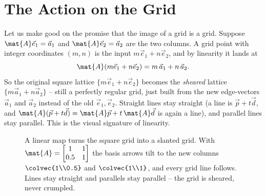 \section{The Action on the Grid}
\label{ch05:grid}

Let us make good on the promise that the image of a grid is a grid. Suppose
$\mat{A}\vec{e}_1 = \vec{a}_1$ and $\mat{A}\vec{e}_2 = \vec{a}_2$ are the two
columns. A grid point with integer coordinates $(m,n)$ is the input
$m\vec{e}_1 + n\vec{e}_2$, and by linearity it lands at
\[
  \mat{A}(m\vec{e}_1 + n\vec{e}_2) = m\,\vec{a}_1 + n\,\vec{a}_2.
\]
So the original square lattice $\{m\vec{e}_1 + n\vec{e}_2\}$ becomes the
\emph{sheared} lattice $\{m\vec{a}_1 + n\vec{a}_2\}$ -- still a perfectly regular
grid, just built from the new edge-vectors $\vec{a}_1$ and $\vec{a}_2$ instead of
the old $\vec{e}_1, \vec{e}_2$. Straight lines stay straight (a line is
$\vec{p} + t\vec{d}$, and $\mat{A}(\vec{p}+t\vec{d}) = \mat{A}\vec{p} +
t\,\mat{A}\vec{d}$ is again a line), and parallel lines stay parallel. This is
the visual signature of linearity.

\begin{figure}[H]
\centering
{}
\caption{A linear map turns the square grid into a slanted grid. With
$\mat{A}=\protect\begin{bmatrix}1 & 1\\ 0.5 & 1\protect\end{bmatrix}$ the basis
arrows tilt to the new columns $\protect\colvec{1\\0.5}$ and $\protect\colvec{1\\1}$,
and every grid line follows. Lines stay straight and parallels stay parallel --
the grid is sheared, never crumpled.}
\label{ch05:fig-grid}
\end{figure}

